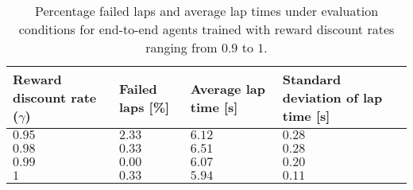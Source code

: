 \begin{table}[htb!]
\centering
\small
\begin{tabularx}{0.75\textwidth}{RLLL} 
    \hline
    \textbf{Reward discount rate ($\gamma$)} & \textbf{Failed laps [\%]} & \textbf{Average lap time [s]} & \textbf{Standard deviation of lap time [s]}\\ 
    \hline
    $0.95$  & $2.33$    & $6.12$  & $0.28$ \\      
    $0.98$  & $0.33$    & $6.51$  & $0.28$ \\
    $0.99$  & $0.00$    & $6.07$  & $0.20$ \\
    $1$     & $0.33$    & $5.94$  & $0.11$ \\
    \hline
\end{tabularx}
\caption[Evaluation results of end-to-end agents with various reward discount rates]{Percentage failed laps and average lap times under evaluation conditions for end-to-end agents trained with reward discount rates ranging from $0.9$ to $1$.}
\label{tab:gamma}
\end{table}
